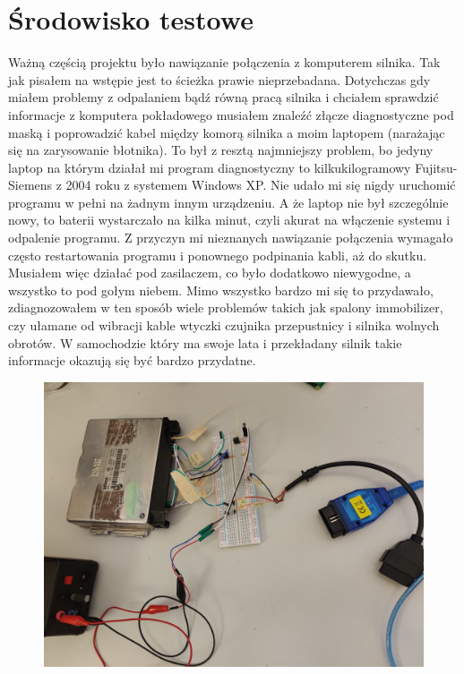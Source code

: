 \documentclass[declaration,shortabstract, inz]{iithesis}
\begin{document}
\section{Środowisko testowe} %
    Ważną częścią projektu było nawiązanie połączenia z komputerem silnika. Tak jak pisałem na wstępie jest to ścieżka prawie nieprzebadana. Dotychczas gdy miałem problemy z odpalaniem bądź równą pracą silnika i chciałem sprawdzić informacje z komputera pokładowego musiałem znaleźć złącze diagnostyczne pod maską i poprowadzić kabel między komorą silnika a moim laptopem (narażając się na zarysowanie błotnika). To był z resztą najmniejszy problem, bo jedyny laptop na którym działał mi program diagnostyczny to kilkukilogramowy Fujitsu-Siemens z 2004 roku z systemem Windows XP. Nie udało mi się nigdy uruchomić programu w pełni na żadnym innym urządzeniu. A że laptop nie był szczególnie nowy, to baterii wystarczało na kilka minut, czyli akurat na włączenie systemu i odpalenie programu. Z przyczyn mi nieznanych nawiązanie połączenia wymagało często restartowania programu i ponownego podpinania kabli, aż do skutku. Musiałem więc działać pod zasilaczem, co było dodatkowo niewygodne, a wszystko to pod gołym niebem. Mimo wszystko bardzo mi się to przydawało, zdiagnozowałem w ten sposób wiele problemów takich jak spalony immobilizer, czy ułamane od wibracji kable wtyczki czujnika przepustnicy i silnika wolnych obrotów. W samochodzie który ma swoje lata i przekładany silnik takie informacje okazują się być bardzo przydatne.
    
    \begin{figure}[htp]
        \centering
        \includegraphics[width=12cm]{images/test_setup_far.jpg}
        \label{fig:test_setup_far}
    \end{figure}
    \FloatBarrier
    
\end{document}
